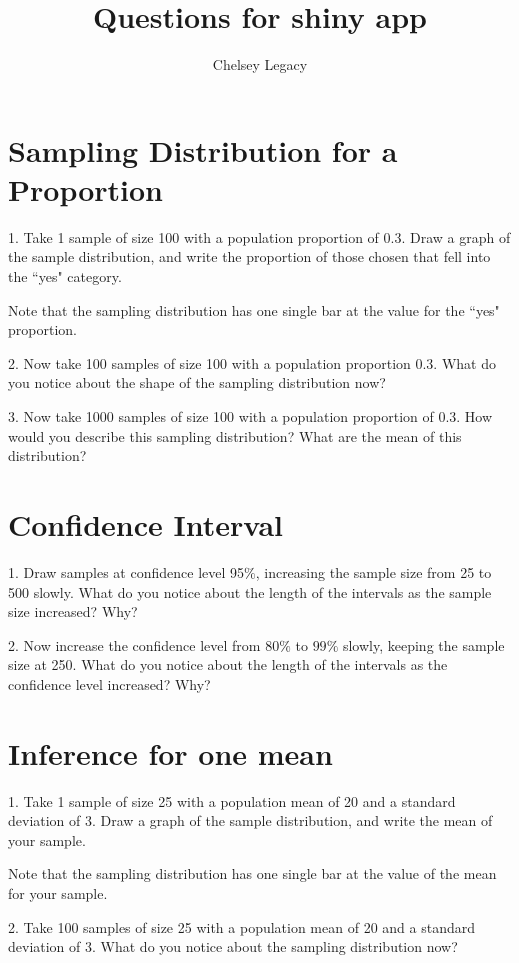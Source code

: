 \documentclass[11pt]{amsart}
\title{Questions for shiny app}
\author{Chelsey Legacy}
\begin{document}
\maketitle
\section{Sampling Distribution for a Proportion}
1.  Take 1 sample of size 100 with a population proportion of 0.3. Draw a graph of the sample distribution, and write the proportion of those chosen that fell into the ``yes" category. 


Note that the sampling distribution has one single bar at the value for the ``yes" proportion.

2.  Now take 100 samples of size 100 with a population proportion 0.3.  What do you notice about the shape of the sampling distribution now?

3. Now take 1000 samples of size 100 with a population proportion of 0.3.  How would you describe this sampling distribution? What are the mean of this distribution?


\section{Confidence Interval}

1. Draw samples at confidence level 95$\%$, increasing the sample size from 25 to 500 slowly. What do you notice about the length of the intervals as the sample size increased? Why?



2. Now increase the confidence level from $80\%$ to $99\%$ slowly, keeping the sample size at 250. What do you notice about the length of the intervals as the confidence level increased? Why?




\section{Inference for one mean}

1.  Take 1 sample of size 25 with a population mean of 20 and a standard deviation of 3. Draw a graph of the sample distribution, and write the mean of your sample.


Note that the sampling distribution has one single bar at the value of the mean for your sample.

2.  Take 100 samples of size 25 with a population mean of 20 and a standard deviation of 3.  What do you notice about the sampling distribution now?
\end{document}
